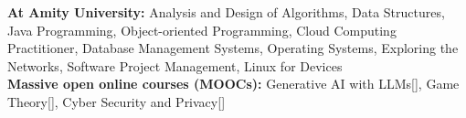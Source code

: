 
\begin{cvparagraph}

\textbf{At Amity University:} Analysis and Design of Algorithms, Data Structures, Java Programming, Object-oriented Programming, Cloud Computing Practitioner, Database Management Systems, Operating Systems, Exploring the Networks, Software Project Management, Linux for Devices
\vspace{0.2cm}\\
\textbf{Massive open online courses (MOOCs):} Generative AI with LLMs[\textbf{}], Game Theory[\textbf{}], Cyber Security and Privacy[\textbf{}]
\end{cvparagraph}